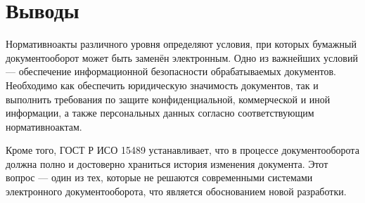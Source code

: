\section{Выводы} \label{rights_conclusion}

Нормативно акты различного уровня определяют условия, при которых бумажный документооборот может быть заменён электронным. Одно из важнейших условий --- обеспечение информационной безопасности обрабатываемых документов. Необходимо как обеспечить юридическую значимость документов, %
так и выполнить требования по защите конфиденциальной, коммерческой и иной информации, а также персональных данных согласно соответствующим нормативно актам.

Кроме того, ГОСТ Р ИСО 15489 устанавливает, что в процессе документооборота должна полно и достоверно храниться история изменения документа. Этот вопрос --- один из тех, которые не решаются современными системами электронного документооборота, что является обоснованием новой разработки.

